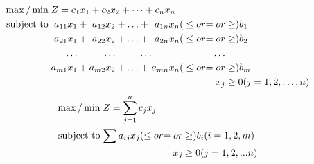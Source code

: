 \documentclass[../main-sheet.tex]{subfiles}
\begin{document}
    \begin{align*}
        \max/\min              &\; Z= c_{1}x_{1} + c_{2}x_{2}+\dots + c_nx_n \\
        \text{subject to} &\;
        \begin{alignedat}[t]{5}
        a_{11}x_{1}&+{} &a_{12}x_{2}& +{} &\dots& +{} &a_{1n}x_n (& \leq or & = or & \geq) b_{1} \\
        a_{21}x_{1}&+{} &a_{22}x_{2}& +{} &\dots& +{} &a_{2n}x_n (& \leq or & = or & \geq) b_{2} \\
               \dots & &        \dots&  && \dots &          &         &         \dots &\\
        a_{m1}x_{1}&+{} &a_{m2}x_{2}& +{} &\dots& +{} &   a_{mn}x_n (& \leq or & = or &    \geq) b_m \\
                 & &           &     &   &     &          &         &      x_j&  \geq0(j=1,2,\dots,n)
        \end{alignedat}
        \end{align*}
        \begin{align*}
            \max/\min              &\; Z=\sum_{j=1}^n c_j x_j \\
            \text{subject to} &\;
            \begin{alignedat}[t]{3}
            \sum a_{ij}x_{j}& (\leq or & = or& \geq) b_i(i=1,2,m) \\
                           &  &                 x_j &\geq0(j=1,2,...n)
            \end{alignedat}
            \end{align*}
\end{document}
